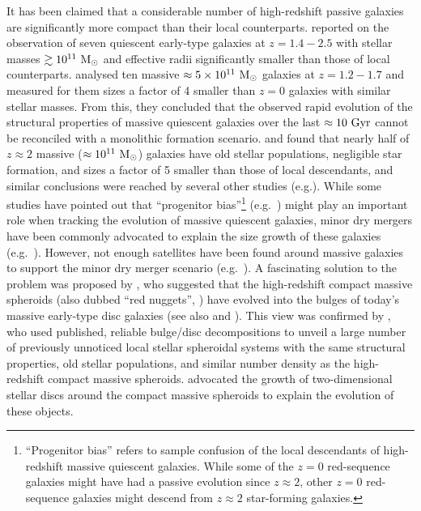 It has been claimed that a considerable number of high-redshift passive galaxies are significantly more compact 
than their local counterparts. 
\citet{daddi2005} reported on the observation of seven quiescent early-type galaxies 
at $z=1.4-2.5$ with stellar masses $\gtrsim 10^{11} \rm~M_\odot$ 
and effective radii significantly smaller than those of local counterparts. 
\citet{trujillo2006} analysed ten massive $\approx 5 \times 10^{11} \rm~M_\odot$ galaxies at $z=1.2-1.7$ 
and measured for them sizes a factor of 4 smaller than $z=0$ galaxies with similar stellar masses. 
From this, they concluded that the observed rapid evolution of the structural properties of massive quiescent galaxies 
over the last $\approx 10 \rm~Gyr$ 
cannot be reconciled with a monolithic formation scenario. 
\citet{kriek2008} and \citet{vandokkum2008} found that nearly half of $z \approx 2$ 
massive ($\approx 10^{11} \rm~M_\odot$) galaxies 
have old stellar populations, negligible star formation, and sizes a factor of 5 smaller than 
those of local descendants, 
and similar conclusions were reached by several other studies 
(e.g.\citealt{toft2007,trujillo2007,zirm2007,buitrago2008,damjanov2009}). 
While some studies have pointed out that ``progenitor bias''\footnote{``Progenitor bias'' refers to sample confusion 
of the local descendants of high-redshift massive quiescent galaxies. 
While some of the $z=0$ red-sequence galaxies might have had a passive evolution since $z \approx 2$, 
other $z=0$ red-sequence galaxies might descend from $z \approx 2$ star-forming galaxies. } 
(e.g.~\citealt{carollo2014}) might play an important role 
when tracking the evolution of massive quiescent galaxies, 
minor dry mergers have been commonly advocated to explain the size growth of these galaxies 
(e.g.~\citealt{hopkins2009,carrasco2010,cimatti2012,fan2013,de2014}).
However, not enough satellites have been found around massive galaxies 
to support the minor dry merger scenario 
(e.g.~\citealt{khochfarburkert2006,maller2006,hopkins2009,naab2009,mclure2013}). 
A fascinating solution to the problem was proposed by \citet{graham2013review}, 
who suggested that the high-redshift compact massive spheroids 
(also dubbed ``red nuggets'', \citealt{damjanov2009}) have evolved into the bulges 
of today's massive early-type disc galaxies (see also \citealt{dullograham2013cores} and \citealt{driver2013}). 
This view was confirmed by \citet{gds2015}, 
who used published, reliable bulge/disc decompositions 
to unveil a large number of previously unnoticed local stellar spheroidal systems 
with the same structural properties, old stellar populations, 
and similar number density as the high-redshift compact massive spheroids. 
\citet{gds2015} advocated the growth of two-dimensional stellar discs around the compact massive spheroids 
to explain the evolution of these objects. \\

